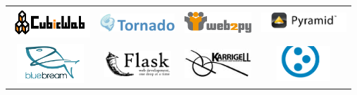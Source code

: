 \documentclass[
    t,
    smaller,
    compress,
    xcolor=svgnames,            %
    table,
]{beamer}
\begin{document}
\begin{frame}
{\begin{tabular}{cccc}
      \includegraphics[width=30mm]{cubicweb_logo.png} &
      \includegraphics[width=28mm]{tornado_logo.png} &
      \includegraphics[width=25mm]{web2py_logo.png} &
      \includegraphics[width=32mm]{pyramid_logo.png} \\[4pt]

      \includegraphics[width=25mm]{bluebream_logo.png} &
      \includegraphics[width=25mm]{flask_logo.png} &
      \includegraphics[width=25mm]{karrigell_logo.png} &
      \includegraphics[width=20mm]{plone_logo.png} \\[4pt]


\end{tabular}}
\end{frame}
\end{document}
